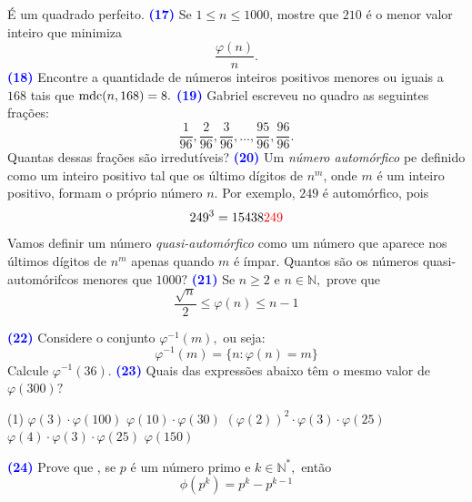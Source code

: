 \documentclass[12pt, a4paper]{article}
\newcommand{\mdc}{{\rm mdc}}
\newcommand{\negrito}[1]{\mbox{\boldmath{$#1$}}}
\begin{document}
É um quadrado perfeito.
\newline
\newline
\textcolor{blue}{\bf(17)} Se $1 \le n \le 1000$, mostre que $210$ é o menor valor inteiro que minimiza 
\[ \frac{\varphi(n)}{n}. \]
\textcolor{blue}{\bf(18)} Encontre a quantidade de números inteiros positivos menores ou iguais a $168$ tais que $\mdc(n, 168) = 8.$
\newline\newline
\textcolor{blue}{\bf(19)} Gabriel escreveu no quadro as seguintes frações:
\[ \frac{1}{96}, \frac{2}{96}, \frac{3}{96}, \ldots , \frac{95}{96}, \frac{96}{96}. \]
Quantas dessas frações são irredutíveis?
\newline\newline
\textcolor{blue}{\bf(20)} Um \emph{número automórfico} pe definido como um inteiro positivo tal que os último dígitos de $n^m$, onde $m$ é um inteiro positivo, formam o próprio número $n.$ Por exemplo, $249$ é automórfico, pois
\[ 249^3 = 15438\textcolor{red}{249} \]
Vamos definir um número \emph{quasi-automórfico} como um número que aparece nos últimos dígitos de $n^m$ apenas quando $m$ é ímpar. Quantos são os números quasi-automórifcos menores que $1000?$
\newline\newline
\textcolor{blue}{\bf(21)} Se $n \ge 2$ e $n \in \mathbb{N},$ prove que 
\[ \frac{\sqrt{n}}{2} \le \varphi(n) \le n - 1 \]

\textcolor{blue}{\bf(22)} Considere o conjunto $\varphi^{-1}(m),$ ou seja:
\[ \varphi^{-1}(m) = \{ n : \varphi(n) = m \} \]
Calcule $\varphi^{-1}(36).$
\newline\newline
\textcolor{blue}{\bf(23)} Quais das expressões abaixo têm o mesmo valor de $\varphi(300)?$
\begin{tasks}[counter-format={(tsk[a])},label-width=3.6ex, label-format = {\bfseries}, column-sep = {0pt}](1)
\task[\textcolor{Floresta}{$\negrito{(a)} $}] $\varphi(3) \cdot \varphi(100)$
\task[\textcolor{Floresta}{$\negrito{(b)} $}] $\varphi(10) \cdot \varphi(30)$
\task[\textcolor{Floresta}{$\negrito{(c)} $}] $\left(\varphi(2) \right)^2 \cdot \varphi(3) \cdot \varphi(25)$
\task[\textcolor{Floresta}{$\negrito{(d)} $}] $\varphi(4) \cdot \varphi(3) \cdot \varphi(25)$
\task[\textcolor{Floresta}{$\negrito{(e)} $}] $\varphi(150)$
\end{tasks}
\textcolor{blue}{\bf(24)} Prove que , se $p$ é um número primo e $k \in \mathbb{N}^*,$ então 
\[ \phi(p^k) = p^k - p^{k-1}\]
\end{document}
